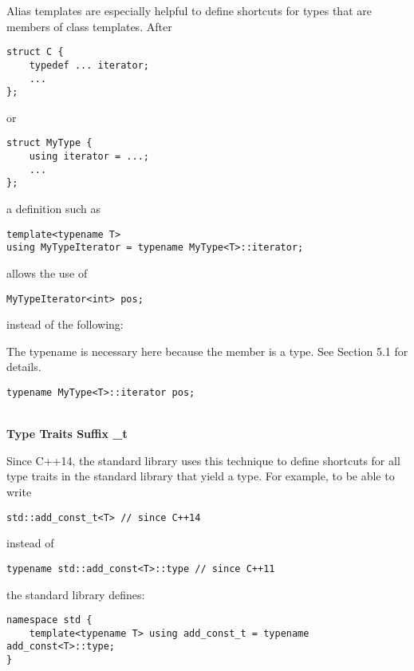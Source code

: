 Alias templates are especially helpful to define shortcuts for types that are members of class templates. After

\begin{lstlisting}[style=styleCXX]
struct C {
	typedef ... iterator;
	...
};
\end{lstlisting}

or

\begin{lstlisting}[style=styleCXX]
struct MyType {
	using iterator = ...;
	...
};
\end{lstlisting}

a definition such as

\begin{lstlisting}[style=styleCXX]
template<typename T>
using MyTypeIterator = typename MyType<T>::iterator;
\end{lstlisting}

allows the use of

\begin{lstlisting}[style=styleCXX]
MyTypeIterator<int> pos;
\end{lstlisting}

instead of the following:

\begin{tcolorbox}[colback=webgreen!5!white,colframe=webgreen!75!black]
\hspace*{0.75cm}The typename is necessary here because the member is a type. See Section 5.1 for details.
\end{tcolorbox}

\begin{lstlisting}[style=styleCXX]
typename MyType<T>::iterator pos;
\end{lstlisting}

\hspace*{\fill} \\ %
\noindent
\textbf{Type Traits Suffix \_t}

Since C++14, the standard library uses this technique to define shortcuts for all type traits in the standard library that yield a type. For example, to be able to write

\begin{lstlisting}[style=styleCXX]
std::add_const_t<T> // since C++14
\end{lstlisting}

instead of

\begin{lstlisting}[style=styleCXX]
typename std::add_const<T>::type // since C++11
\end{lstlisting}

the standard library defines:

\begin{lstlisting}[style=styleCXX]
namespace std {
	template<typename T> using add_const_t = typename add_const<T>::type;
}
\end{lstlisting}




